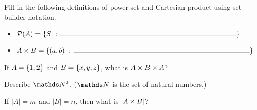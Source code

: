 \begin{exer}
Fill in the following definitions of power set and Cartesian product using set-builder notation.
\begin{itemize}
\item $\powerset{A} = \setbuild{S}{\line(1,0){250}}$
\item $\setproduct{A}{B} = \setbuild{(a, b)}{\line(1,0){250}}$
\end{itemize}
\end{exer}

\begin{exer}
If $A = \left\lbrace 1, 2 \right\rbrace$ and $B = \left\lbrace x ,y, z \right\rbrace$, what is $A \times B \times A$?
\end{exer}

\begin{exer}
Describe $\naturals^2$. ($\naturals$ is the set of natural numbers.)
\end{exer}

\begin{exer}
If $|A| = m$ and $|B| = n$, then what is $|A \times B|$?
\end{exer}
